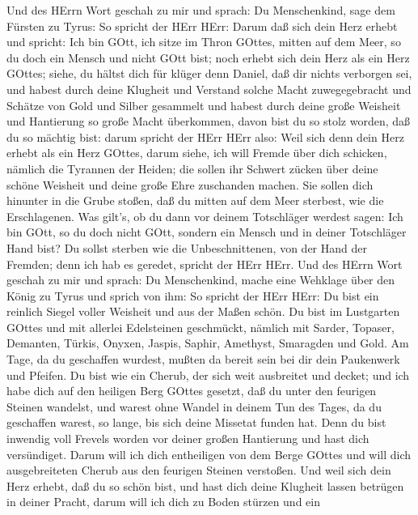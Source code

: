  Und des HErrn Wort geschah zu mir und sprach: 
Du Menschenkind, sage dem Fürsten zu Tyrus: So spricht der HErr HErr:
Darum daß sich dein Herz erhebt und spricht: Ich bin GOtt, ich sitze im
Thron GOttes, mitten auf dem Meer, so du doch ein Mensch und nicht GOtt
bist; noch erhebt sich dein Herz als ein Herz GOttes; 
siehe, du hältst dich für klüger denn Daniel, daß dir nichts verborgen
sei,  und habest durch deine Klugheit und Verstand solche
Macht zuwegegebracht und Schätze von Gold und Silber gesammelt
 und habest durch deine große Weisheit und Hantierung so
große Macht überkommen, davon bist du so stolz worden, daß du so mächtig
bist:  darum spricht der HErr HErr also: Weil sich denn dein
Herz erhebt als ein Herz GOttes,  darum siehe, ich will
Fremde über dich schicken, nämlich die Tyrannen der Heiden; die sollen
ihr Schwert zücken über deine schöne Weisheit und deine große Ehre
zuschanden machen.  Sie sollen dich hinunter in die Grube
stoßen, daß du mitten auf dem Meer sterbest, wie die Erschlagenen.
 Was gilt's, ob du dann vor deinem Totschläger werdest
sagen: Ich bin GOtt, so du doch nicht GOtt, sondern ein Mensch und in
deiner Totschläger Hand bist?  Du sollst sterben wie die
Unbeschnittenen, von der Hand der Fremden; denn ich hab es geredet,
spricht der HErr HErr.  Und des HErrn Wort geschah zu mir
und sprach:  Du Menschenkind, mache eine Wehklage über den
König zu Tyrus und sprich von ihm: So spricht der HErr HErr: Du bist ein
reinlich Siegel voller Weisheit und aus der Maßen schön. 
Du bist im Lustgarten GOttes und mit allerlei Edelsteinen geschmückt,
nämlich mit Sarder, Topaser, Demanten, Türkis, Onyxen, Jaspis, Saphir,
Amethyst, Smaragden und Gold. Am Tage, da du geschaffen wurdest, mußten
da bereit sein bei dir dein Paukenwerk und Pfeifen.  Du
bist wie ein Cherub, der sich weit ausbreitet und decket; und ich habe
dich auf den heiligen Berg GOttes gesetzt, daß du unter den feurigen
Steinen wandelst,  und warest ohne Wandel in deinem Tun des
Tages, da du geschaffen warest, so lange, bis sich deine Missetat funden
hat.  Denn du bist inwendig voll Frevels worden vor deiner
großen Hantierung und hast dich versündiget. Darum will ich dich
entheiligen von dem Berge GOttes und will dich ausgebreiteten Cherub aus
den feurigen Steinen verstoßen.  Und weil sich dein Herz
erhebt, daß du so schön bist, und hast dich deine Klugheit lassen
betrügen in deiner Pracht, darum will ich dich zu Boden stürzen und ein
